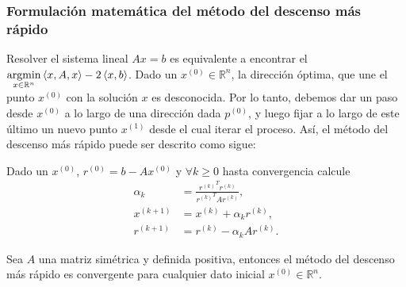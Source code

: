 \begin{frame}

	\frametitle{Formulación matemática del método del descenso más rápido}
	Resolver el sistema lineal $Ax=b$ es equivalente a encontrar el
	\begin{math}
		\operatornamewithlimits{argmin}\limits_{x\in\mathbb{R}^{n}}
		\left\langle x,A,x\right\rangle-
		2\left\langle x,b\right\rangle
	\end{math}.
	Dado un $x^{\left(0\right)}\in\mathbb{R}^{n}$, la
	\alert{dirección óptima}, que une el punto $x^{\left(0\right)}$ con
	la solución $x$ es desconocida.
	Por lo tanto, debemos dar un paso desde $x^{\left(0\right)}$ a lo
	largo de una dirección dada $p^{\left(0\right)}$, y luego fijar a
	lo largo de este último un nuevo punto $x^{\left(1\right)}$ desde
	el cual iterar el proceso.
	Así, el \alert{método del descenso más rápido} puede ser descrito
	como sigue:

	Dado un $x^{\left(0\right)}$,
	$r^{\left(0\right)}=b-Ax^{\left(0\right)}$ y $\forall k\geq0$ hasta
	convergencia calcule
	\begin{align*}
		\alpha_{k}
		                     & =
		\frac{
		{r^{\left(k\right)}}^{T}r^{\left(k\right)}
		}{
		{r^{\left(k\right)}}^{T}Ar^{\left(k\right)}
		},                            \\
		x^{\left(k+1\right)} & =
		x^{\left(k\right)}+
		\alpha_{k}r^{\left(k\right)}, \\
		r^{\left(k+1\right)} & =
		r^{\left(k\right)}-
		\alpha_{k}Ar^{\left(k\right)}.
	\end{align*}

	\begin{theorem}
		Sea $A$ una matriz simétrica y definida positiva, entonces el
		\alert{método del descenso más rápido} es convergente para
		cualquier dato inicial $x^{\left(0\right)}\in\mathbb{R}^{n}$.
	\end{theorem}
\end{frame}


